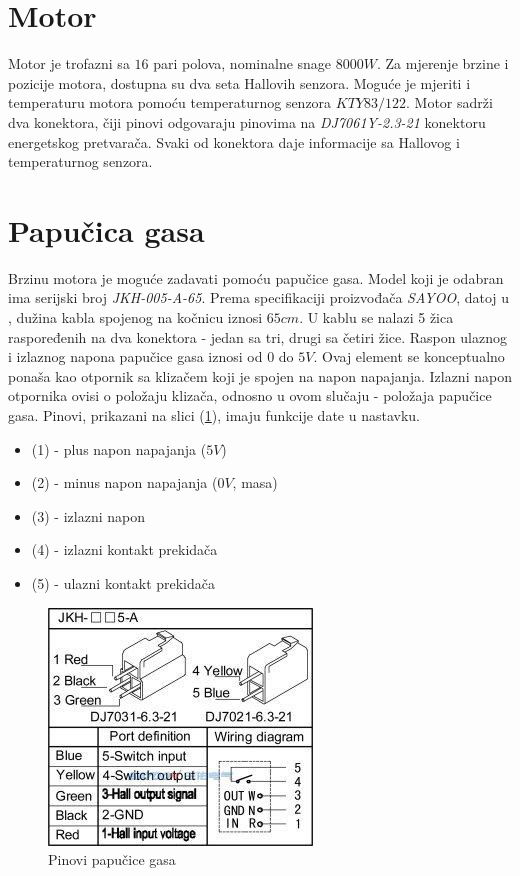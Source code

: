 \section{Motor}

\qquad Motor je trofazni sa $16$ pari polova, nominalne snage $8000W$. Za mjerenje brzine i pozicije motora, dostupna su dva seta Hallovih senzora. Moguće je mjeriti i temperaturu motora pomoću temperaturnog senzora $KTY83/122$. Motor sadrži dva konektora, čiji pinovi odgovaraju pinovima na \textit{DJ7061Y-2.3-21} konektoru energetskog pretvarača. Svaki od konektora daje informacije sa Hallovog i temperaturnog senzora.

\section{Papučica gasa}

\qquad Brzinu motora je moguće zadavati pomoću papučice gasa. Model koji je odabran ima serijski broj \textit{JKH-005-A-65}. Prema specifikaciji proizvođača \textit{SAYOO}, datoj u \cite{jkh005a65}, dužina kabla spojenog na kočnicu iznosi $65cm$. U kablu se nalazi 5 žica raspoređenih na dva konektora - jedan sa tri, drugi sa četiri žice. Raspon ulaznog i izlaznog napona papučice gasa iznosi od $0$ do $5V$. Ovaj element se konceptualno ponaša kao otpornik sa klizačem koji je spojen na napon napajanja. Izlazni napon otpornika ovisi o položaju klizača, odnosno u ovom slučaju - položaja papučice gasa. Pinovi, prikazani na slici (\ref{fig:gas}), imaju funkcije date u nastavku.

\begin{itemize}
	\item (1) - plus napon napajanja ($5V$)
	\item (2) - minus napon napajanja ($0V$, masa)
	\item (3) - izlazni napon
	\item (4) - izlazni kontakt prekidača
	\item (5) - ulazni kontakt prekidača
\end{itemize}

\begin{figure}
\centering
\includegraphics[scale=1]{slike/foot_throttle.png}
\caption{Pinovi papučice gasa}
\label{fig:gas}
\end{figure}

